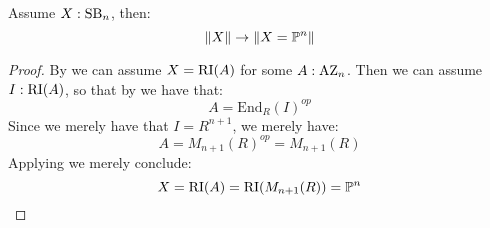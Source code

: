 \begin{theorem}\label{chatelet-theorem}
Assume $X:\mathrm{SB}_n$, then:
\[\lVert X \rVert\to\lVert X=\mathbb{P}^n \rVert\]
\end{theorem}

\begin{proof}
By  we can assume $X=\mathrm{RI}(A)$ for some $A:\mathrm{AZ}_n$. Then we can assume $I:\mathrm{RI}(A)$, so that by  we have that:
\[A=\mathrm{End}_R(I)^{op}\]
Since we merely have that $I=R^{n+1}$, we merely have:
\[A = M_{n+1}(R)^{op} = M_{n+1}(R)\]
Applying  we merely conclude:
\[X=\mathrm{RI}(A)=\mathrm{RI}(M_{n+1}(R)) = \mathbb{P}^n\]
\end{proof}